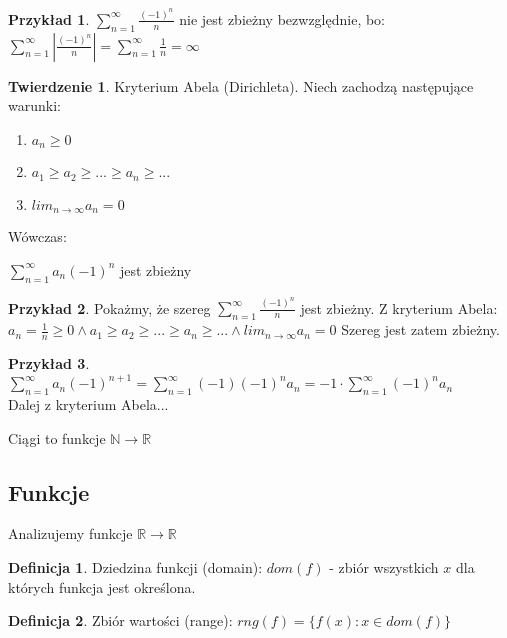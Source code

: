 \documentclass{article}
\theoremstyle{definition}
\newtheorem{de}{Definicja}[subsection]
\theoremstyle{definition}
\newtheorem{tw}{Twierdzenie}[subsection]
\theoremstyle{definition}
\newtheorem{pk}{Przykład}[subsection]
\theoremstyle{definition}
\begin{document}
\begin{pk}
    $\sum_{n=1}^{\infty} \frac{(-1)^n}{n}$ nie jest zbieżny bezwzględnie, bo:\\
    $\sum_{n=1}^{\infty} \left|\frac{(-1)^n}{n}\right| = \sum_{n=1}^{\infty} \frac{1}{n} = \infty$\\
\end{pk}

\begin{tw}
    Kryterium Abela (Dirichleta). Niech zachodzą następujące warunki:
    \begin{enumerate}
        \item $a_n\geq 0$
        \item $a_1\geq a_2\geq ... \geq a_n \geq ...$
        \item $lim_{n\rightarrow\infty} a_n = 0$
    \end{enumerate}
    Wówczas:
    \begin{center}
        $\sum_{n=1}^{\infty} a_n(-1)^n$ jest zbieżny
    \end{center}
\end{tw}

\begin{pk}
    Pokażmy, że szereg $\sum_{n=1}^{\infty} \frac{(-1)^n}{n}$ jest zbieżny. Z kryterium Abela:\\
    $a_n=\frac{1}{n}\geq 0 \land a_1\geq a_2\geq ... \geq a_n \geq ... \land lim_{n\rightarrow\infty} a_n = 0$
    Szereg jest zatem zbieżny.
\end{pk}

\begin{pk}
    $\sum_{n=1}^{\infty} a_n (-1)^{n+1}= \sum_{n=1}^{\infty} (-1)(-1)^n a_n = -1 \cdot \sum_{n=1}^{\infty} (-1)^n a_n$\\
    Dalej z kryterium Abela...
\end{pk}

Ciągi to funkcje $\mathbb{N}\rightarrow\mathbb{R}$

\subsection{Funkcje}

Analizujemy funkcje $\mathbb{R}\rightarrow\mathbb{R}$

\begin{de}
    Dziedzina funkcji (domain): $dom(f)$ - zbiór wszystkich $x$ dla których funkcja jest określona.
\end{de}

\begin{de}
    Zbiór wartości (range): $rng(f) = \{f(x): x\in dom(f)\}$
\end{de}
\end{document}
